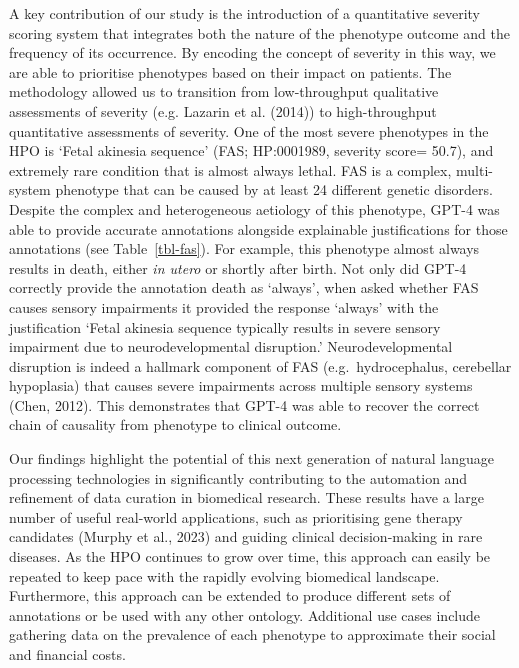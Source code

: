 \documentclass[
]{agujournal2019}
\begin{document}
A key contribution of our study is the introduction of a quantitative
severity scoring system that integrates both the nature of the phenotype
outcome and the frequency of its occurrence. By encoding the concept of
severity in this way, we are able to prioritise phenotypes based on
their impact on patients. The methodology allowed us to transition from
low-throughput qualitative assessments of severity (e.g. Lazarin et al.
(2014)) to high-throughput quantitative assessments of severity. One of
the most severe phenotypes in the HPO is `Fetal akinesia sequence' (FAS;
HP:0001989, severity score= 50.7), and extremely rare condition that is
almost always lethal. FAS is a complex, multi-system phenotype that can
be caused by at least 24 different genetic disorders. Despite the
complex and heterogeneous aetiology of this phenotype, GPT-4 was able to
provide accurate annotations alongside explainable justifications for
those annotations (see Table~\ref{tbl-fas}). For example, this phenotype
almost always results in death, either \emph{in utero} or shortly after
birth. Not only did GPT-4 correctly provide the annotation death as
`always', when asked whether FAS causes sensory impairments it provided
the response `always' with the justification `Fetal akinesia sequence
typically results in severe sensory impairment due to neurodevelopmental
disruption.' Neurodevelopmental disruption is indeed a hallmark
component of FAS (e.g.~hydrocephalus, cerebellar hypoplasia) that causes
severe impairments across multiple sensory systems (Chen, 2012). This
demonstrates that GPT-4 was able to recover the correct chain of
causality from phenotype to clinical outcome.

Our findings highlight the potential of this next generation of natural
language processing technologies in significantly contributing to the
automation and refinement of data curation in biomedical research. These
results have a large number of useful real-world applications, such as
prioritising gene therapy candidates (Murphy et al., 2023) and guiding
clinical decision-making in rare diseases. As the HPO continues to grow
over time, this approach can easily be repeated to keep pace with the
rapidly evolving biomedical landscape. Furthermore, this approach can be
extended to produce different sets of annotations or be used with any
other ontology. Additional use cases include gathering data on the
prevalence of each phenotype to approximate their social and financial
costs.
\end{document}
